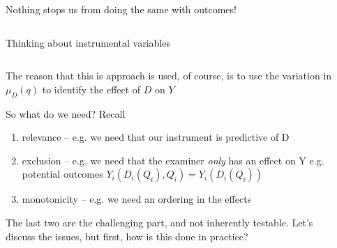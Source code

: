 \documentclass[notes,11pt, aspectratio=169]{beamer}
\newenvironment{wideitemize}{\itemize\addtolength{\itemsep}{10pt}}{\enditemize}
\begin{document}
\begin{frame}{Nothing stops us from doing the same with outcomes!}
\begin{columns}[onlytextwidth, T]
\begin{column}{.5\textwidth}
      \end{column}%
    \end{columns}
\end{frame}

\begin{frame}{Thinking about instrumental variables}
  \begin{columns}[onlytextwidth, T] %
    \begin{column}{.7\textwidth}
      \begin{wideitemize}
      \item The reason that this is approach is used, of course, is to
        use the variation in $\mu_{D}(q)$ to identify the effect of
        $D$ on $Y$
      \item   So what do we need? Recall
        \begin{enumerate}
          \item  relevance -- e.g. we need that our instrument is predictive of D
          \item exclusion -- e.g. we need that the examiner
            \emph{only} has an effect on Y e.g. potential outcomes
            $Y_{i}(D_{i}(Q_{i}), Q_{i}) = Y_{i}(D_{i}(Q_{i}))$
          \item monotonicity -- e.g. we need an ordering in the effects
          \end{enumerate}
        \item The last two are the challenging part, and not
          inherently testable. Let's discuss the issues, but first,
          how is this done in practice?
      \end{wideitemize}
    \end{column}%
    \hfill%
    \begin{column}{.5\textwidth}
    \end{column}%
  \end{columns}
\end{frame}
\end{document}

